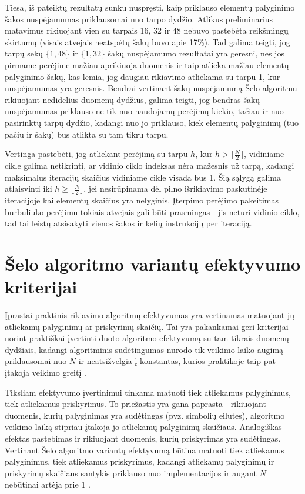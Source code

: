 \documentclass{VUMIFInfBakalaurinis}
\begin{document}
Tiesa, iš pateiktų rezultatų sunku nuspręsti, kaip priklauso elementų palyginimo šakos nuspėjamumas priklausomai nuo tarpo dydžio.
Atlikus preliminarius matavimus rikiuojant vien su tarpais 16, 32 ir 48 nebuvo pastebėta reikšmingų skirtumų (visais atvejais neatspėtų šakų buvo apie 17\%).
Tad galima teigti, jog tarpų sekų $\{1, 48 \}$ ir $\{1, 32 \}$ šakų nuspėjamumo rezultatai yra geresni, nes jos pirmame perėjime
mažiau aprikiuoja duomenis ir taip atlieka mažiau elementų palyginimo šakų, kas lemia, jog daugiau rikiavimo atliekama su tarpu 1, kur nuspėjamumas yra geresnis.
Bendrai vertinant šakų nuspėjamumą Šelo algoritmu rikiuojant nedidelius duomenų dydžius,
galima teigti, jog bendras šakų nuspėjamumas priklauso ne tik nuo naudojamų perėjimų kiekio, tačiau ir nuo
pasirinktų tarpų dydžio, kadangi nuo jo priklauso, kiek elementų palyginimų (tuo pačiu ir šakų) bus atlikta su tam tikru tarpu.

Vertinga pastebėti, jog atliekant perėjimą su tarpu $h$, kur $h > \lfloor\frac{N}{2}\rfloor$, vidiniame cikle galima netikrinti,
ar vidinio ciklo indeksas nėra mažesnis už tarpą, kadangi maksimalus iteracijų skaičius vidiniame cikle visada bus 1.
Šią sąlygą galima atlaisvinti iki $h \geq \lfloor\frac{N}{2}\rfloor$, jei nesirūpinama dėl pilno išrikiavimo paskutinėje iteracijoje kai elementų skaičius yra nelyginis.
Įterpimo perėjimo pakeitimas burbuliuko perėjimu tokiais atvejais gali būti prasmingas - 
jis neturi vidinio ciklo, tad tai leistų atsisakyti vienos šakos ir kelių instrukcijų per iteraciją. 

\section{Šelo algoritmo variantų efektyvumo kriterijai}

Įprastai praktinis rikiavimo algoritmų efektyvumas yra vertinamas matuojant jų atliekamų palyginimų ar priskyrimų skaičių.
Tai yra pakankamai geri kriterijai norint praktiškai įvertinti duoto algoritmo efektyvumą su tam tikrais duomenų dydžiais,
kadangi algoritminis sudėtingumas nurodo tik veikimo laiko augimą priklausomai nuo $N$ ir
neatsižvelgia į konstantas, kurios praktikoje taip pat įtakoja veikimo greitį \cite{biggar2005sorting}.

Tiksliam efektyvumo įvertinimui tinkama matuoti tiek atliekamus palyginimus, tiek atliekamus priskyrimus.
To priežastis yra gana paprasta - rikiuojant duomenis, kurių palyginimas yra sudėtingas (pvz. simbolių eilutes),
algoritmo veikimo laiką stipriau įtakoja jo atliekamų palyginimų skaičiaus.
Analogiškas efektas pastebimas ir rikiuojant duomenis, kurių priskyrimas yra sudėtingas.
Vertinant Šelo algoritmo variantų efektyvumą būtina matuoti tiek atliekamus palyginimus, tiek atliekamus priskyrimus, kadangi
atliekamų palyginimų ir priskyrimų skaičiaus santykis priklauso nuo implementacijos ir augant $N$ nebūtinai artėja prie 1 \cite{Radavičius_Baranauskas_2013}.
\end{document}
